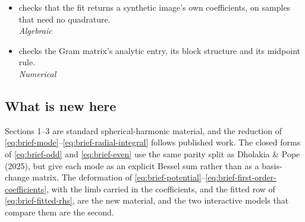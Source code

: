 \begin{itemize}
  \item[$\checkmark$]  checks that the fit returns a synthetic
    image's own coefficients, on samples that need no quadrature.
    \\[1pt] \quad \emph{Algebraic}
  \item[$\checkmark$]  checks the Gram matrix's analytic entry, its block
    structure and its midpoint rule.
    \\[1pt] \quad \emph{Numerical}
\end{itemize}

\subsection{What is new here}

Sections 1--3 are standard spherical-harmonic material, and the reduction of
\eqref{eq:brief-mode}--\eqref{eq:brief-radial-integral} follows published work.  The
closed forms of \eqref{eq:brief-odd} and \eqref{eq:brief-even} use the same parity split
as Dholakia \& Pope (2025), but give each mode as an explicit Bessel sum rather than as a
basis-change matrix.  The deformation of
\eqref{eq:brief-potential}--\eqref{eq:brief-first-order-coefficients}, with the limb
carried in the coefficients, and the fitted row of \eqref{eq:brief-fitted-rhs}, are the new
material, and the two interactive models that compare them are the second.

